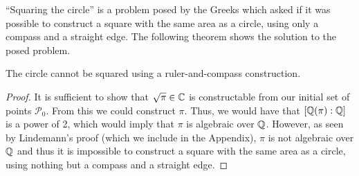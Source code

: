 ``Squaring the circle'' is a problem posed by the Greeks which asked if it was possible to construct a square with the same area as a circle, using only a compass and a straight edge. The following theorem shows the solution to the posed problem.

\begin{theorem}
    The circle cannot be squared using a ruler-and-compass construction.
\end{theorem}

\begin{proof}  
    
    It is sufficient to show that $\sqrt{\pi}\in \mathbb C$ is constructable from our initial set of points $\mathcal{P}_0$. From this we could construct $\pi$. Thus, we would have that $[\mathbb Q(\pi):\mathbb Q]$ is a power of 2, which would imply that $\pi$ is algebraic over $\mathbb Q$. However, as seen by Lindemann's proof (which we include in the Appendix), $\pi$ is not algebraic over $\mathbb Q$ and thus it is impossible to construct a square with the same area as a circle, using nothing but a compass and a straight edge.
\end{proof}
